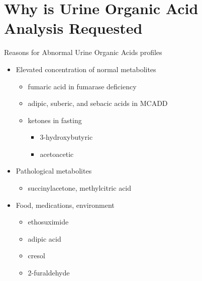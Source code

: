 \documentclass[presentation]{beamer}
\begin{document}
\section{Why is Urine Organic Acid Analysis Requested}
\label{sec:orgheadline15}
\begin{frame}[label={sec:orgheadline9}]{Reasons for Abnormal Urine Organic Acids profiles}
\begin{itemize}
\item Elevated concentration of normal metabolites
\begin{itemize}
\item fumaric acid in fumarase deficiency
\item adipic, suberic, and sebacic acids in MCADD
\item ketones in fasting
\begin{itemize}
\item 3-hydroxybutyric
\item acetoacetic
\end{itemize}
\end{itemize}

\item Pathological metabolites
\begin{itemize}
\item succinylacetone, methylcitric acid
\end{itemize}

\item Food, medications, environment
\begin{itemize}
\item ethosuximide
\item adipic acid
\item cresol
\item 2-furaldehyde
\end{itemize}
\end{itemize}
\end{frame}
\end{document}

